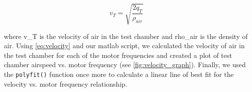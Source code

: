 \begin{equation} \label{eq:velocity}
    v_T = \sqrt{\frac{2q_T}{\rho_{air}}}
\end{equation}

\noindent{} where \gls{v_T} is the velocity of air in the test chamber and \gls{rho_air} is the density of air. Using \autoref{eq:velocity} and our \acrshort{matlab} script, we calculated the velocity of air in the test chamber for each of the motor frequencies and created a plot of test chamber airspeed vs. motor frequency (see \autoref{fig:velocity_graph}). Finally, we used the \verb|polyfit()| function once more to calculate a linear line of best fit for the velocity vs. motor frequency relationship.